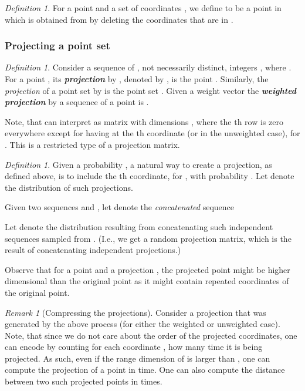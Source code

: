 \documentclass[12pt]{article}\usepackage[cm]{fullpage}
\newcommand{\emphic}[2]{\textcolor{blue25}{\textbf{\emph{#1}}}\index{#2}}
\renewcommand{\emphic}[2]{\textbf{\emph{#1}}}
\newcommand{\emphi}[1]{\emphic{#1}{#1}}
\theoremstyle{remark}\theoremheaderfont{\sf}\theorembodyfont{\upshape}\newtheorem{defn}[theorem]{Definition}
\newtheorem{remark}[theorem]{Remark}\newtheorem{example}[theorem]{Example}\newtheorem*{remark:unnumbered}[theorem]{Remark}
\numberwithin{figure}{section}\numberwithin{table}{section}\numberwithin{equation}{section}
\providecommand{\deflab}[1]{\label{def:#1}}
\newcommand{\remlab}[1]{\label{rem:#1}}
\renewcommand{\th}{th\xspace}
\begin{document}
\begin{defn}
    \deflab{r:m:c}For a point  and a set of coordinates
    , we define  to
    be a point in  which is obtained from
     by deleting the coordinates that are in .
\end{defn}






\subsubsection{Projecting a point set}





\begin{defn}
    \deflab{set:proj}Consider a sequence  of , not necessarily distinct,
    integers , where
    .  For a point
    , its
    \emphi{projection} by , denoted by , is the
    point .
    Similarly, the \emph{projection} of a point set
     by  is the point set
    .
Given a weight vector  the
    \emphi{weighted projection} by a sequence  of a point
     is
    .

    Note, that can interpret  as matrix with dimensions
    , where the \th row is zero everywhere except
    for having  at the \th coordinate (or  in the
    unweighted case), for . This is a restricted
    type of a projection matrix.
\end{defn}


\begin{defn}
    \deflab{t:splay}Given a probability , a natural way to create a
    projection, as defined above, is to include the \th coordinate,
    for , with probability . Let 
    denote the distribution of such projections.
    
    Given two sequences  and
    , let 
    denote the \emph{concatenated} sequence
    
    Let  denote the distribution resulting from
    concatenating  such independent sequences sampled from
    .  (I.e., we get a random projection matrix, which is
    the result of concatenating  independent projections.)
\end{defn}

Observe that for a point  and a projection
, the projected point  might
be higher dimensional than the original point  as it might
contain repeated coordinates of the original point.

\begin{remark}[{Compressing the projections}]
    \remlab{compress}Consider a projection  that was
    generated by the above process (for either the weighted or
    unweighted case). Note, that since we do not care about the order
    of the projected coordinates, one can encode  by counting
    for each coordinate , how many time it is
    being projected. As such, even if the range dimension of  is
    larger than , one can compute the projection of a point in
     time. One can also compute the distance between two such
    projected points in  times.
\end{remark}
\end{document}

